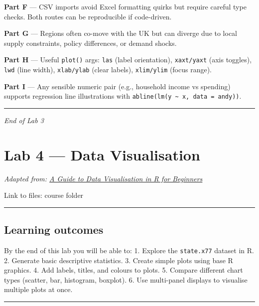 \documentclass[
  letterpaper,
  DIV=11,
  numbers=noendperiod]{scrreprt}
\begin{document}
\textbf{Part F} --- CSV imports avoid Excel formatting quirks but
require careful type checks. Both routes can be reproducible if
code-driven.

\textbf{Part G} --- Regions often co-move with the UK but can diverge
due to local supply constraints, policy differences, or demand shocks.

\textbf{Part H} --- Useful \texttt{plot()} args: \texttt{las} (label
orientation), \texttt{xaxt/yaxt} (axis toggles), \texttt{lwd} (line
width), \texttt{xlab/ylab} (clear labels), \texttt{xlim/ylim} (focus
range).

\textbf{Part I} --- Any sensible numeric pair (e.g., household income vs
spending) supports regression line illustrations with
\texttt{abline(lm(y\ \textasciitilde{}\ x,\ data\ =\ andy))}.

\begin{center}\rule{0.5\linewidth}{0.5pt}\end{center}

\emph{End of Lab 3}


\chapter{Lab 4 --- Data Visualisation}\label{lab-4-data-visualisation}

\emph{Adapted from:
\href{https://towardsdatascience.com/a-guide-to-data-visualisation-in-r-for-beginners-ef6d41a34174}{A
Guide to Data Visualisation in R for Beginners}}

Link to files: course folder

\begin{center}\rule{0.5\linewidth}{0.5pt}\end{center}

\section{Learning outcomes}\label{learning-outcomes-3}

By the end of this lab you will be able to: 1. Explore the
\texttt{state.x77} dataset in R. 2. Generate basic descriptive
statistics. 3. Create simple plots using base R graphics. 4. Add labels,
titles, and colours to plots. 5. Compare different chart types (scatter,
bar, histogram, boxplot). 6. Use multi-panel displays to visualise
multiple plots at once.

\begin{center}\rule{0.5\linewidth}{0.5pt}\end{center}
\end{document}
